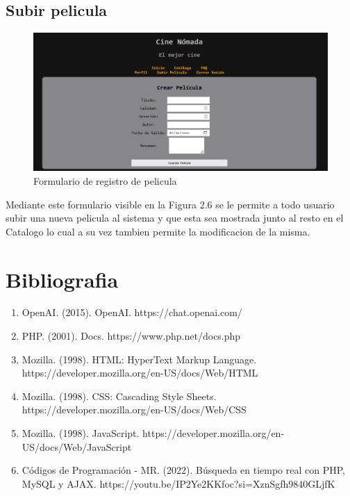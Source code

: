 \documentclass{report}
\begin{document}
        \clearpage
        \section{Subir pelicula} 
            \begin{figure}[h!]
                \centering
                \includegraphics[width=\textwidth]{./img/ui/subirp.png}
                \caption{Formulario de registro de pelicula}
            \end{figure}
            Mediante este formulario visible en la Figura 2.6 se le permite a todo usuario subir una nueva pelicula al sistema y que esta sea mostrada junto al resto en el Catalogo lo cual a su vez tambien permite la modificacion de la misma.
    \chapter{Bibliografia}
		\begin{enumerate}
			\item OpenAI. (2015). OpenAI. https://chat.openai.com/
			\item PHP. (2001). Docs. https://www.php.net/docs.php
			\item Mozilla. (1998). HTML: HyperText Markup Language. https://developer.mozilla.org/en-US/docs/Web/HTML
			\item Mozilla. (1998). CSS: Cascading Style Sheets. https://developer.mozilla.org/en-US/docs/Web/CSS
			\item Mozilla. (1998). JavaScript. https://developer.mozilla.org/en-US/docs/Web/JavaScript
			\item Códigos de Programación - MR. (2022). Búsqueda en tiempo real con PHP, MySQL y AJAX. https://youtu.be/IP2Ye2KKfoc?si=XznSgfh9840GLjfK
		\end{enumerate}
\end{document}
